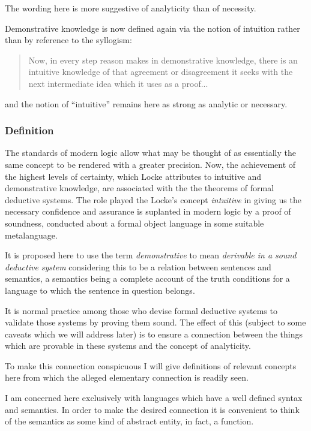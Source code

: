 \documentclass[numreferences]{rbjk}
\begin{document}
\begin{article}
The wording here is more suggestive of analyticity than of necessity.

Demonstrative knowledge is now defined again via the notion of intuition rather than by reference to the syllogism:

\begin{quote}
Now, in every step reason makes in demonstrative knowledge, there is an intuitive knowledge of that agreement or disagreement it seeks with the next intermediate idea which it uses as a proof...
\end{quote}

and the notion of ``intuitive'' remains here as strong as analytic or necessary.

\subsubsection{Definition}

The standards of modern logic allow what may be thought of as essentially the same concept to be rendered with a greater precision.
Now, the achievement of the highest levels of certainty, which Locke attributes to intuitive and demonstrative knowledge, are associated with the the theorems of formal deductive systems.
The role played the Locke's concept {\it intuitive} in giving us the necessary confidence and assurance is suplanted in modern logic by a proof of soundness, conducted about a formal object language in some suitable metalanguage.

It is proposed here to use the term {\it demonstrative} to mean {\it derivable in a sound deductive system} considering this to be a relation between sentences and semantics, a semantics being a complete account of the truth conditions for a language to which the sentence in question belongs.

It is normal practice among those who devise formal deductive systems to validate those systems by proving them sound.
The effect of this (subject to some caveats which we will address later) is to ensure a connection between the things which are provable in these systems and the concept of analyticity.

To make this connection conspicuous I will give definitions of relevant concepts here from which the alleged elementary connection is readily seen.

I am concerned here exclusively with languages which have a well defined syntax and semantics.
In order to make the desired connection it is convenient to think of the semantics as some kind of abstract entity, in fact, a function.


\end{article}
\end{document}
